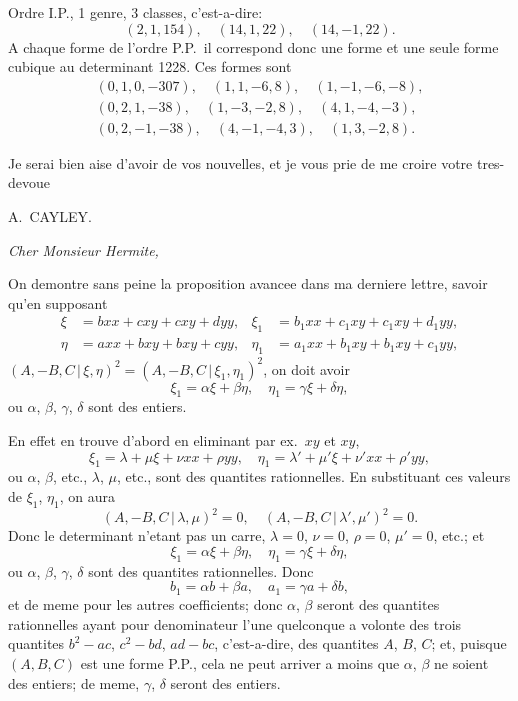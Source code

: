\documentclass[12pt,a4paper]{article}
\theoremstyle{plain}
\begin{document}
Ordre I.P., 1 genre, 3 classes, c'est-a-dire:
\[
(2,1,154), \quad (14,1,22), \quad (14,-1,22).
\]
A chaque forme de l'ordre P.P.\ il correspond donc une forme et une seule forme cubique au determinant 1228. Ces formes sont
\begin{gather*}
(0,1,0,-307), \quad (1,1,-6,8), \quad (1,-1,-6,-8), \\
(0,2,1,-38), \quad (1,-3,-2,8), \quad (4,1,-4,-3), \\
(0,2,-1,-38), \quad (4,-1,-4,3), \quad (1,3,-2,8).
\end{gather*}

Je serai bien aise d'avoir de vos nouvelles, et je vous prie de me croire votre tres-devoue

\begin{flushright}
A.~CAYLEY.
\end{flushright}

\textit{Cher Monsieur Hermite,}

On demontre sans peine la proposition avancee dans ma derniere lettre, savoir qu'en supposant
\begin{align*}
\xi &= bxx + cxy + cxy + dyy, & \xi_1 &= b_1 xx + c_1 xy + c_1 xy + d_1 yy, \\
\eta &= axx + bxy + bxy + cyy, & \eta_1 &= a_1 xx + b_1 xy + b_1 xy + c_1 yy,
\end{align*}
$(A,-B,C \,|\, \xi,\eta)^2 = (A,-B,C \,|\, \xi_1,\eta_1)^2$, on doit avoir
\[
\xi_1 = \alpha\xi + \beta\eta, \quad \eta_1 = \gamma\xi + \delta\eta,
\]
ou $\alpha$, $\beta$, $\gamma$, $\delta$ sont des entiers.

En effet en trouve d'abord en eliminant par ex.\ $xy$ et $xy$,
\[
\xi_1 = \lambda + \mu\xi + \nu xx + \rho yy, \quad \eta_1 = \lambda' + \mu'\xi + \nu'xx + \rho'yy,
\]
ou $\alpha$, $\beta$, etc., $\lambda$, $\mu$, etc., sont des quantites rationnelles. En substituant ces valeurs de $\xi_1$, $\eta_1$, on aura
\[
(A,-B,C \,|\, \lambda,\mu)^2 = 0, \quad (A,-B,C \,|\, \lambda',\mu')^2 = 0.
\]
Donc le determinant n'etant pas un carre, $\lambda=0$, $\nu=0$, $\rho=0$, $\mu'=0$, etc.; et
\[
\xi_1 = \alpha\xi + \beta\eta, \quad \eta_1 = \gamma\xi + \delta\eta,
\]
ou $\alpha$, $\beta$, $\gamma$, $\delta$ sont des quantites rationnelles. Donc
\[
b_1 = \alpha b + \beta a, \quad a_1 = \gamma a + \delta b,
\]
et de meme pour les autres coefficients; donc $\alpha$, $\beta$ seront des quantites rationnelles ayant pour denominateur l'une quelconque a volonte des trois quantites $b^2-ac$, $c^2-bd$, $ad-bc$, c'est-a-dire, des quantites $A$, $B$, $C$; et, puisque $(A,B,C)$ est une forme P.P., cela ne peut arriver a moins que $\alpha$, $\beta$ ne soient des entiers; de meme, $\gamma$, $\delta$ seront des entiers.
\end{document}

